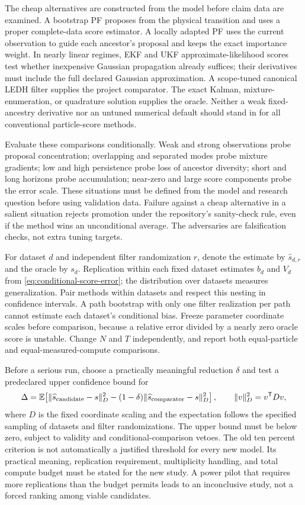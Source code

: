 The cheap alternatives are constructed from the model before claim data are
examined. A bootstrap PF proposes from the physical transition and uses a
proper complete-data score estimator. A locally adapted PF uses the current
observation to guide each ancestor's proposal and keeps the exact importance
weight. In nearly linear regimes, EKF and UKF approximate-likelihood scores
test whether inexpensive Gaussian propagation already suffices; their
derivatives must include the full declared Gaussian approximation. A
scope-tuned canonical LEDH filter supplies the project comparator. The exact
Kalman, mixture-enumeration, or quadrature solution supplies the oracle.
Neither a weak fixed-ancestry derivative nor an untuned numerical default
should stand in for all conventional particle-score methods.

Evaluate these comparisons conditionally. Weak and strong observations probe
proposal concentration; overlapping and separated modes probe mixture
gradients; low and high persistence probe loss of ancestor diversity; short
and long horizons probe accumulation; near-zero and large score components
probe the error scale. These situations must be defined from the model and
research question before using validation data. Failure against a cheap
alternative in a salient situation rejects promotion under the repository's
sanity-check rule, even if the method wins an unconditional average. The
adversaries are falsification checks, not extra tuning targets.

For dataset $d$ and independent filter randomization $r$, denote the estimate
by $\widehat s_{d,r}$ and the oracle by $s_d$. Replication within each fixed
dataset estimates $b_d$ and $V_d$ from
\eqref{eq:conditional-score-error}; the distribution over datasets measures
generalization. Pair methods within datasets and respect this nesting in
confidence intervals. A path bootstrap with only one filter realization per
path cannot estimate each dataset's conditional bias. Freeze parameter
coordinate scales before comparison, because a relative error divided by a
nearly zero oracle score is unstable. Change $N$ and $T$ independently, and
report both equal-particle and equal-measured-compute comparisons.

Before a serious run, choose a practically meaningful reduction $\delta$ and
test a predeclared upper confidence bound for
\begin{equation}
 \Delta=\mathbb E\!\left[
    \|\widehat s_{\rm candidate}-s\|_D^2
    -(1-\delta)\|\widehat s_{\rm comparator}-s\|_D^2\right],
 \qquad \|v\|_D^2=v^\mathsf T Dv,
 \label{eq:next-study-criterion}
\end{equation}
where $D$ is the fixed coordinate scaling and the expectation follows the
specified sampling of datasets and filter randomizations. The upper bound must be below
zero, subject to validity and conditional-comparison vetoes. The old ten
percent criterion is not automatically a justified threshold for every new
model. Its practical meaning, replication requirement, multiplicity handling,
and total compute budget must be stated for the new study. A power pilot that
requires more replications than the budget permits leads to an inconclusive
study, not a forced ranking among viable candidates.

